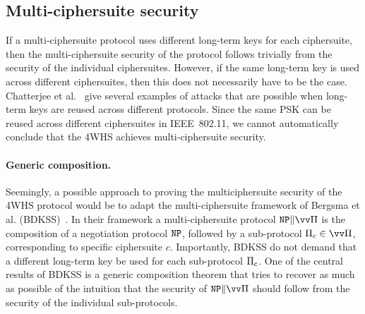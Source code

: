 \subsection{Multi-ciphersuite security}\label{sec:802.11:multi-cipher:multi-cipher}
If a multi-ciphersuite protocol uses different long-term keys for each ciphersuite,
then the multi-ciphersuite security of the protocol follows trivially from the security of the individual ciphersuites.
However,
if the same long-term key is used across different ciphersuites,
then this does not necessarily have to be the case.
Chatterjee et al.~\cite{INDOCRYPT:ChaMenUst09} give several examples of attacks that are possible when long-term keys are reused across different protocols.
Since the same PSK can be reused across different ciphersuites in IEEE~802.11,
we cannot automatically conclude that the 4WHS achieves multi-ciphersuite security.


\paragraph{Generic composition.}
Seemingly,
a possible approach to proving the multi\-cipher\-suite security of the 4WHS protocol would be to adapt the multi-cipher\-suite framework of Bergsma et al. (BDKSS)~\cite{CCS:BDKSS14}. 
In their framework a multi-cipher\-suite protocol $\protocolneg \concat \vprotocol$
is the composition of a negotiation protocol $\mathtt{NP}$,
followed by a sub-protocol $\protocol_c \in \vprotocol$,
corresponding to specific ciphersuite $c$.
Importantly,
BDKSS do not demand that a different long-term key be used for each sub-protocol $\mathrm{\Pi}_c$.
One of the central results of BDKSS is a generic composition theorem that tries to recover as much as possible of the intuition that the security of $\multiprotocol$ should follow from the security of the individual sub-protocols.

